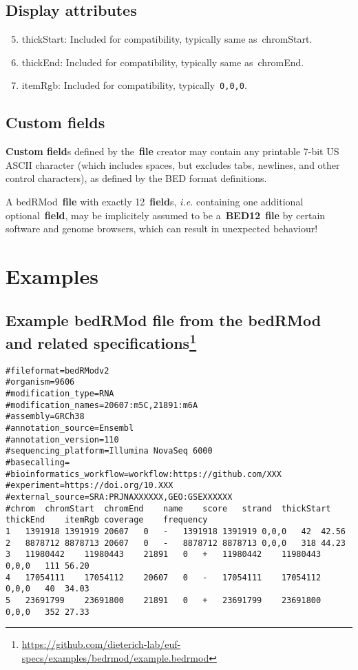 \documentclass[11pt]{article}
\begin{document}
\subsection{Display attributes}
\begin{enumerate}
  \setcounter{enumi}{4}

\item \textsf{thickStart}: Included for compatibility, typically same as~\textsf{chromStart}.

\item \textsf{thickEnd}: Included for compatibility, typically same as~\textsf{chromEnd}.

\item \textsf{itemRgb}: Included for compatibility, typically~\texttt{0,0,0}.

\end{enumerate}

\subsection{Custom fields}\label{sec:custom_fields}

\textbf{Custom field}s defined by the~\textbf{file} creator may contain any printable 7-bit US \ac{ASCII} character (which includes spaces, but excludes tabs, newlines, and other control characters), as defined by the \ac{BED} format definitions.

A \acs{bedRMod}~\textbf{file} with exactly 12~\textbf{field}s, \textit{i.e.} containing one additional optional~\textbf{field}, may be implicitely 
assumed to be a~\textbf{BED12}~\textbf{file} by certain software and genome browsers, which can result in unexpected behaviour! 

\section{Examples}

\subsection[title]{Example bedRMod file from the \acs{bedRMod} and related specifications\footnote{\url{https://github.com/dieterich-lab/euf-specs/examples/bedrmod/example.bedrmod}}}\label{sec:example-bedrmod}

\begin{verbatim}
#fileformat=bedRModv2
#organism=9606
#modification_type=RNA
#modification_names=20607:m5C,21891:m6A
#assembly=GRCh38
#annotation_source=Ensembl
#annotation_version=110
#sequencing_platform=Illumina NovaSeq 6000
#basecalling=
#bioinformatics_workflow=workflow:https://github.com/XXX
#experiment=https://doi.org/10.XXX
#external_source=SRA:PRJNAXXXXXX,GEO:GSEXXXXXX
#chrom	chromStart	chromEnd	name	score	strand	thickStart	thickEnd	itemRgb	coverage	frequency
1	1391918	1391919	20607	0	-	1391918	1391919	0,0,0	42	42.56
2	8878712	8878713	20607	0	-	8878712	8878713	0,0,0	318	44.23
3	11980442	11980443	21891	0	+	11980442	11980443	0,0,0	111	56.20
4	17054111	17054112	20607	0	-	17054111	17054112	0,0,0	40	34.03
5	23691799	23691800	21891	0	+	23691799	23691800	0,0,0	352	27.33
\end{verbatim}
\end{document}
